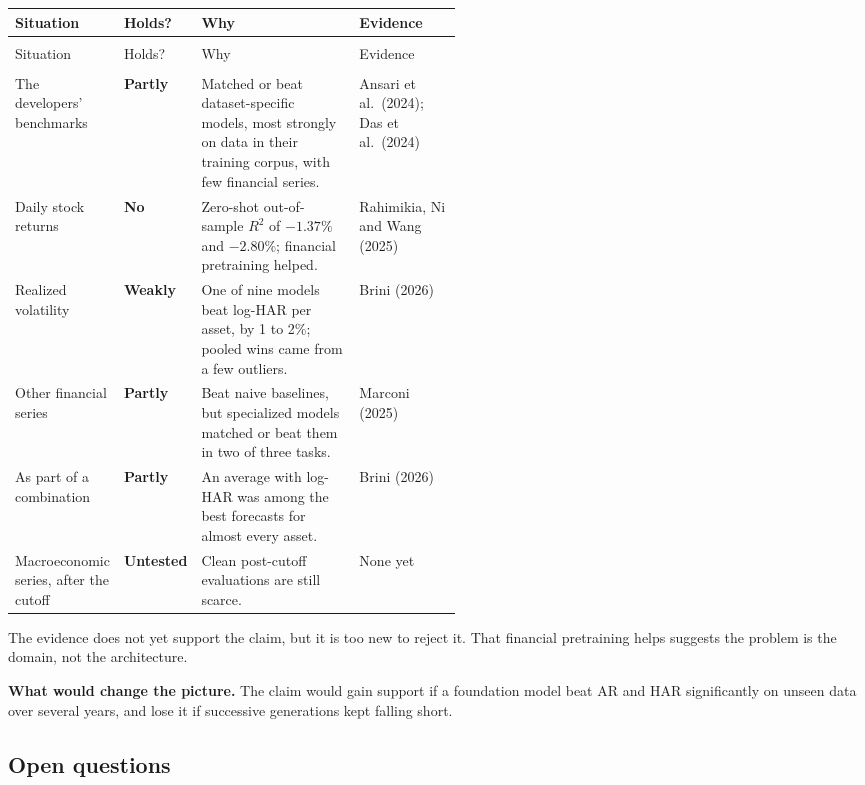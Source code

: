 {\small
\begin{longtable}{@{}>{\raggedright\arraybackslash}p{0.19\linewidth}>{\raggedright\arraybackslash}p{0.10\linewidth}>{\raggedright\arraybackslash}p{}>{\raggedright\arraybackslash}p{0.23\linewidth}@{}}
\toprule
Situation & Holds? & Why & Evidence \\
\midrule
\endfirsthead
\multicolumn{4}{@{}l}{\emph{(continued)}} \\
\toprule
Situation & Holds? & Why & Evidence \\
\midrule
\endhead
\midrule
\multicolumn{4}{r@{}}{\emph{(continued on the next page)}} \\
\endfoot
\bottomrule
\endlastfoot
The developers' benchmarks & \textbf{Partly} & Matched or beat dataset-specific models, most strongly on data in their training corpus, with few financial series. & Ansari et al.\ (2024); Das et al.\ (2024) \\
\addlinespace[3pt]
Daily stock returns & \textbf{No} & Zero-shot out-of-sample $R^2$ of $-1.37\%$ and $-2.80\%$; financial pretraining helped. & Rahimikia, Ni and Wang (2025) \\
\addlinespace[3pt]
Realized volatility & \textbf{Weakly} & One of nine models beat log-HAR per asset, by 1 to 2\%; pooled wins came from a few outliers. & Brini (2026) \\
\addlinespace[3pt]
Other financial series & \textbf{Partly} & Beat naive baselines, but specialized models matched or beat them in two of three tasks. & Marconi (2025) \\
\addlinespace[3pt]
As part of a combination & \textbf{Partly} & An average with log-HAR was among the best forecasts for almost every asset. & Brini (2026) \\
\addlinespace[3pt]
Macroeconomic series, after the cutoff & \textbf{Untested} & Clean post-cutoff evaluations are still scarce. & None yet \\
\end{longtable}
}

The evidence does not yet support the claim, but it is too new to reject it. That financial pretraining helps suggests the problem is the domain, not the architecture.

\textbf{What would change the picture.} The claim would gain support if a foundation model beat AR and HAR significantly on unseen data over several years, and lose it if successive generations kept falling short.

\subsection{Open questions}
\label{sec:21-open}

